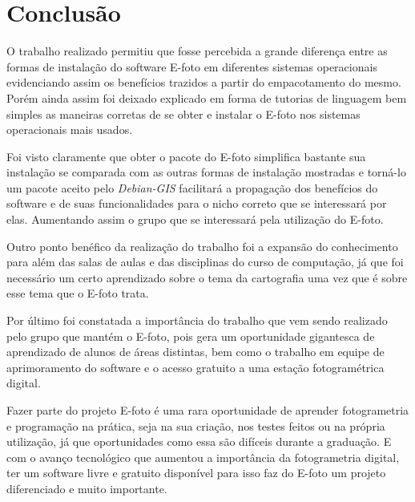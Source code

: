 \chapter{Conclusão}

O trabalho realizado permitiu que fosse percebida a grande diferença entre as formas de instalação do software E-foto em diferentes sistemas operacionais evidenciando assim os benefícios trazidos a partir do empacotamento do mesmo. Porém ainda assim foi deixado explicado em forma de tutorias de linguagem bem simples as maneiras corretas de se obter e instalar o E-foto nos sistemas operacionais mais usados.

Foi visto claramente que obter o pacote do E-foto simplifica bastante sua instalação se comparada com as outras formas de instalação mostradas e torná-lo um pacote aceito pelo \textit{Debian-GIS} facilitará a propagação dos benefícios do software e de suas funcionalidades para o nicho correto que se interessará por elas. Aumentando assim o grupo que se interessará pela utilização do E-foto. 

Outro ponto benéfico da realização do trabalho foi a expansão do conhecimento para além das salas de aulas e das disciplinas do curso de computação, já que foi necessário um certo aprendizado sobre o tema da cartografia uma vez que é sobre esse tema que o E-foto trata.

Por último foi constatada a importância do trabalho que vem sendo realizado pelo grupo que mantém o E-foto, pois gera um oportunidade gigantesca de aprendizado de alunos de áreas distintas, bem como o trabalho em equipe de aprimoramento do software e o acesso gratuito a uma estação fotogramétrica digital.     

Fazer parte do projeto E-foto é uma rara oportunidade de aprender fotogrametria e programação na prática, seja na sua criação, nos testes feitos ou na própria utilização, já que oportunidades como essa são difíceis durante a graduação. E com o avanço tecnológico que aumentou a importância da fotogrametria digital, ter um software livre e gratuito disponível para isso faz do E-foto um projeto diferenciado e muito importante. 